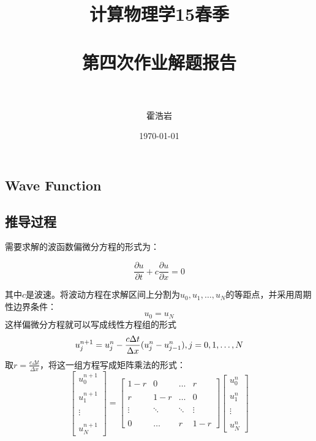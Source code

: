 \documentclass[paper=a4, fontsize=11pt]{scrartcl} %
\title{
\normalfont \normalsize 
\textsc{计算物理学15春季} \\ [25pt] %
\horrule{0.5pt} \\[0.4cm] %
\huge 第四次作业解题报告 \\ %
\horrule{2pt} \\[0.5cm] %
}
\author{霍浩岩} %
\date{\normalsize\today} %
\numberwithin{equation}{section} %
\numberwithin{figure}{section} %
\numberwithin{table}{section} %
\begin{document}
\begin{CJK*}{UTF8}{gbsn}

\maketitle %


\section{Wave Function}

\subsection{推导过程}

需要求解的波函数偏微分方程的形式为：

\begin{equation}
\frac{\partial u}{\partial t}+c\frac{\partial u}{\partial x}=0 
\end{equation}

其中$c$是波速。将波动方程在求解区间上分割为$u_0,u_1,\dots,u_N$的等距点，并采用周期性边界条件：
\begin{equation}
u_0 = u_N
\end{equation}
这样偏微分方程就可以写成线性方程组的形式
\begin{equation}
u_j^{n+1}=u_j^n-\frac{c\Delta t}{\Delta x}(u_j^n-u_{j-1}^n), j=0,1,\dots,N \\\\
\end{equation}
取$r=\frac{c\Delta t}{\Delta x}$，将这一组方程写成矩阵乘法的形式：
\begin{equation}
\begin{bmatrix}
u_0^{n+1} \\\\ u_1^{n+1} \\\\ \vdots \\\\ u_N^{n+1} 
\end{bmatrix} = \begin{bmatrix}
1-r & 0 & \dots & r \\\\
r & 1-r & \dots & 0 \\\\
\vdots & \ddots & \ddots & \vdots \\\\
0 & \dots & r & 1-r
\end{bmatrix} \begin{bmatrix}
u_0^n \\\\ u_1^n \\\\ \vdots \\\\ u_N^n 
\end{bmatrix}
\end{equation}


\end{CJK*}
\end{document}
